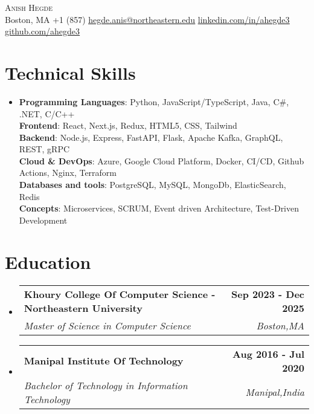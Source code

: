 \documentclass[letterpaper,11pt]{article}
\makeatletter
\newcommand{\resumeSubheading}[4]{
  \vspace{-4pt}\item
    \begin{tabular*}{1.0\textwidth}[t]{l@{\extracolsep{\fill}}r}
      \textbf{#1} & \textbf{\small #2} \\
      \textit{\small#3} & \textit{\small #4} \\
    \end{tabular*}\vspace{-10pt}
}
\newcommand{\resumeSubHeadingListStart}{\begin{itemize}[leftmargin=0.0in, label={}]}
\newcommand{\resumeSubHeadingListEnd}{\end{itemize}}
\makeatother
\begin{document}
\begin{center}
    {\Huge \scshape Anish Hegde} \\ \vspace{1pt}
    {\small Boston, MA \quad\textbar\quad +1 (857) \quad\textbar\quad
    \href{mailto:hegde.anis@northeastern.edu}{\underline{hegde.anis@northeastern.edu}} \quad\textbar\quad
    \href{https://www.linkedin.com/in/ahegde3/}{\underline{linkedin.com/in/ahegde3}} \quad\textbar\quad
    \href{https://github.com/ahegde3}{\underline{github.com/ahegde3}}}
    \vspace{-8pt}
\end{center}

\vspace{2pt}

\section*{Technical Skills}
\begin{itemize}[leftmargin=0.05in, label={}]
 \item[] {\small
     \textbf{Programming Languages}{: Python, JavaScript/TypeScript, Java, C\#, .NET, C/C++} \\
     \textbf{Frontend}{: React, Next.js, Redux, HTML5, CSS, Tailwind} \\
     \textbf{Backend}{: Node.js, Express, FastAPI, Flask, Apache Kafka, GraphQL, REST, gRPC} \\
     \textbf{Cloud \& DevOps}{: Azure, Google Cloud Platform, Docker, CI/CD, Github Actions, Nginx, Terraform} \\
     \textbf{Databases and tools}{: PostgreSQL, MySQL, MongoDb, ElasticSearch, Redis} \\
     \textbf{Concepts}{: Microservices, SCRUM, Event driven Architecture, Test-Driven Development}
 }
\end{itemize}
\vspace{-14pt}

\section*{Education}
  \resumeSubHeadingListStart
  \resumeSubheading
      {Khoury College Of Computer Science - Northeastern University}{Sep 2023 - Dec 2025}
      {Master of Science in Computer Science}{Boston,MA}
    \resumeSubheading
      {Manipal Institute Of Technology}{Aug 2016 - Jul 2020}
      {Bachelor of Technology in Information Technology}{Manipal,India}
  \resumeSubHeadingListEnd
\end{document}
